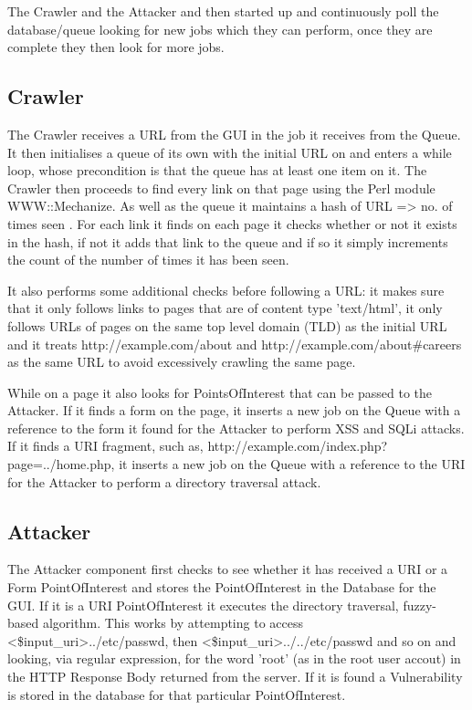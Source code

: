 \documentclass[12pt,a4paper]{article}
\begin{document}
The Crawler and the Attacker and then started up and continuously poll the database/queue looking for new jobs which they can perform, once they are complete they then look for more jobs.

\subsection{Crawler}
The Crawler receives a URL from the GUI in the job it receives from the Queue.  It then initialises a queue of its own with the initial URL on and enters a while loop, whose precondition is that the queue has at least one item on it.  The Crawler then proceeds to find every link on that page using the Perl module WWW::Mechanize.  As well as the queue it maintains a hash of { URL => no. of times seen }.  For each link it finds on each page it checks whether or not it exists in the hash, if not it adds that link to the queue and if so it simply increments the count of the number of times it has been seen.

It also performs some additional checks before following a URL: it makes sure that it only follows links to pages that are of content type 'text/html',  it only follows URLs of pages on the same top level domain (TLD) as the initial URL and it treats http://example.com/about and http://example.com/about\#careers as the same URL to avoid excessively crawling the same page.

While on a page it also looks for PointsOfInterest that can be passed to the Attacker.  If it finds a form on the page, it inserts a new job on the Queue with a reference to the form it found for the Attacker to perform XSS and SQLi attacks.  If it finds a URI fragment, such as, http://example.com/index.php?page=../home.php, it inserts a new job on the Queue with a reference to the URI for the Attacker to perform a directory traversal attack.

\subsection{Attacker}
The Attacker component first checks to see whether it has received a URI or a Form PointOfInterest and stores the PointOfInterest in the Database for the GUI.  If it is a URI PointOfInterest it executes the directory traversal, fuzzy-based algorithm.  This works by attempting to access <\$input\_uri>../etc/passwd, then <\$input\_uri>../../etc/passwd and so on and looking, via regular expression, for the word 'root' (as in the root user accout) in the HTTP Response Body returned from the server.  If it is found a Vulnerability is stored in the database for that particular PointOfInterest.
\end{document}
